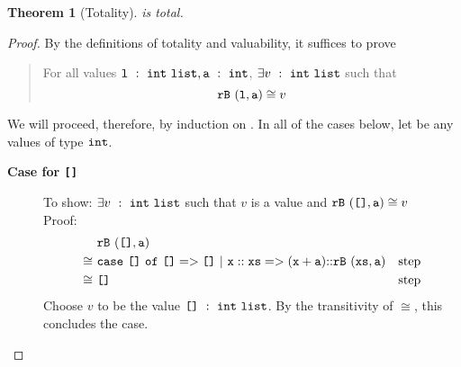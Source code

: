 \documentclass[11pt]{article}
\newtheorem{theorem}{Theorem}
\newcommand{\ttt}[1]{\texttt{#1}}
\begin{document}
\begin{theorem}[Totality]
\label{thrm:total}
\sml{\rb} is total.
\end{theorem}

\newcommand{\totalp}[1]{$\exists \oftp{v}{\tlst{\tint}}$ such that $v$ is a
  value and $\ce{\mappm{\rb}{({#1},a)}}{v}$}

\begin{proof}
By the definitions of totality and valuability, it suffices to prove
\begin{quote}
  For all values $\mathtt{{l}}\ :\ {{\mathtt{int}}~\mathtt{list}}, \mathtt{{a}}\ :\ {\mathtt{int}}$, $\exists
  {v}\ :\ {{\mathtt{int}}~\mathtt{list}}$ such that $${{\mathtt{rB}}~{\mathtt{(l,a)}}} \cong {v}$$
\end{quote}
We will proceed, therefore, by induction on . In all of the cases
below, let  be any values of type $\mathtt{int}$.

\begin{description}
\item [\textbf{Case for \ttt{[]}}] To show: \totalp{\vnil}\\
  Proof:
  \begin{align*}
          & {\mathtt{rB}}~{\mathtt{(\texttt{[]},a)}} &\\
    \cong~& \mathtt{case}~{\texttt{[]}}~\mathtt{of}~{\texttt{[]}} => {\texttt{[]}}~|~{\mathtt{x::xs}} => {\mathtt{(x+{a})}\mathtt{::}{\mathtt{rB}}~{\mathtt{(xs,{a})}}} & \text{step}\\
    \cong~& \texttt{[]} & \text{step}
  \end{align*}
  Choose $v$ to be the value ${\texttt{[]}}\ :\ {{\mathtt{int}}~\mathtt{list}}$. By the
  transitivity of $\cong$, this concludes the case.


\end{description}
\end{proof}
\end{document}
